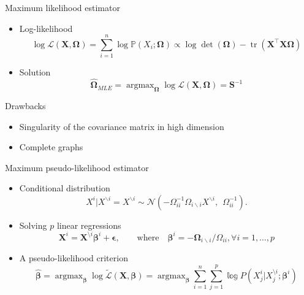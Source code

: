 \documentclass[11pt]{beamer}
\newcommand\Sigmab{{\boldsymbol{\Sigma}}}
\newcommand\Omegab{{\boldsymbol{\Omega}}}
\newcommand{\Xbf}{{\boldsymbol{X}}}
\newcommand{\emphase}[1]{\textcolor{Complement}{#1}}
\newcommand{\argmax}{\mathop{\mathrm{argmax}}}
\begin{document}
\begin{frame}{Maximum likelihood estimator}
	
	\begin{itemize}
		\item Log-likelihood
		$$\log \mathcal{L}(\Xbf, \Omegab) = \sum_{i=1}^n \log \mathbb P(X_i; \Omegab) \propto \log \det (\Omegab) - \operatorname{tr}(\Xbf ^\top \Xbf \Omegab)$$
		\item Solution 
		$$\widehat \Omegab_{MLE} = \argmax_{\mathbf \Omega} \log \mathcal{L}(\Xbf, \Omegab) = \mathbf S^{-1}$$ %
	\end{itemize}
	
	\begin{block}{Drawbacks}
		\begin{itemize}
			\item Singularity of the covariance matrix in high dimension
			\item Complete graphs
		\end{itemize}
	\end{block}
\end{frame}

\begin{frame}{Maximum pseudo-likelihood estimator}
	
	\begin{itemize}
		\item Conditional distribution 
		$$X^i|X^{\backslash i} = X^{\backslash i} \sim \mathcal N \left ( -\Omega_{ii}^{-1} \Omega_{i\backslash i}  X^{\backslash i}, ~~ \Omega_{ii}^{-1} \right).$$
		\item Solving $p$ \emphase{linear regressions}
		\small $$\boldsymbol X^i = \Xbf^{\setminus i} \boldsymbol \beta^i + \boldsymbol \epsilon, \quad \quad \text{where} \quad \boldsymbol \beta^i = - \boldsymbol \Omega_{i \backslash i}/\Omega_{ii}, \forall i=1, \dots, p$$
		\item A pseudo-likelihood criterion \citep{Ambroise2009}
		$$\hat{\boldsymbol{\beta}} = \argmax_{\boldsymbol{\beta}} \log \tilde{\mathcal L} (\Xbf, \boldsymbol{\beta}) = \argmax_{\boldsymbol{\beta}} \sum_{i=1}^n \sum_{j=1}^p \mathbb \log P \left (X_j^i | X^{\setminus i}_j; \boldsymbol \beta^i \right)$$
	\end{itemize}
\end{frame}
\end{document}
